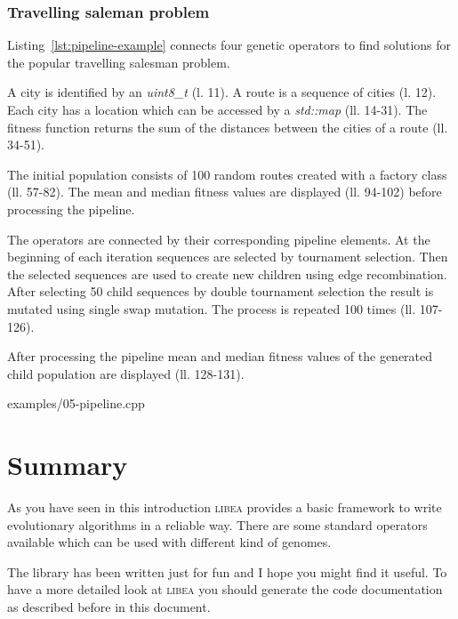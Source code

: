 \documentclass[a4paper]{article}
\begin{document}
\subsubsection*{Travelling saleman problem}

Listing~\ref{lst:pipeline-example} connects four genetic operators to find solutions for the popular travelling salesman problem.

A city is identified by an \textit{uint8\_t} (l. 11). A route is a sequence of cities (l. 12). Each city has a location which can be accessed by a \textit{std::map} (ll. 14-31). The fitness function returns the sum of the distances between the cities of a route (ll. 34-51).

The initial population consists of 100 random routes created with a factory class (ll. 57-82). The mean and median fitness values are displayed (ll. 94-102) before processing the pipeline.

The operators are connected by their corresponding pipeline elements. At the beginning of each iteration sequences are selected by tournament selection. Then the selected sequences are used to create new children using edge recombination. After selecting 50 child sequences by double tournament selection the result is mutated using single swap mutation. The process is repeated 100 times (ll. 107-126).

After processing the pipeline mean and median fitness values of the generated child population are displayed (ll. 128-131).

\begin{lstinputlisting}[caption=pipeline operators,label=lst:pipeline-example]{examples/05-pipeline.cpp}
\end{lstinputlisting}

\section{Summary}

As you have seen in this introduction \textsc{libea} provides a basic framework to write evolutionary algorithms in a reliable way. There are some standard operators available which can be used with different kind of genomes.

The library has been written just for fun and I hope you might find it useful. To have a more detailed look at \textsc{libea} you should generate the code documentation as described before in this document.
\end{document}
